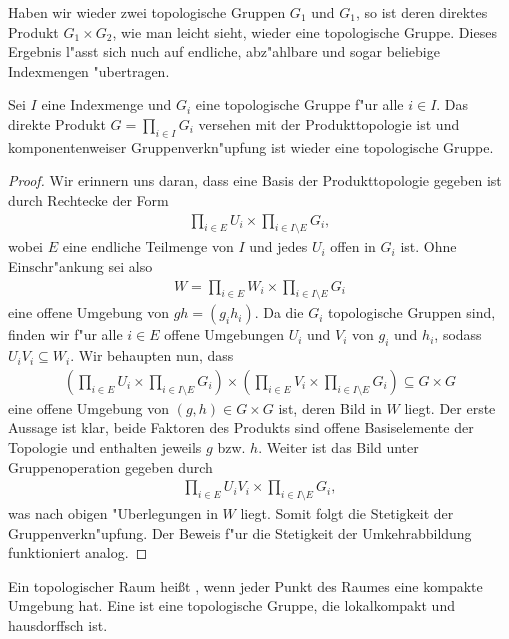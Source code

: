 	Haben wir wieder zwei topologische Gruppen $G_1$ und $G_1$, so ist deren direktes Produkt $G_1\times G_2$, wie man leicht sieht, wieder eine topologische Gruppe.
	Dieses Ergebnis l"asst sich nuch auf endliche, abz"ahlbare und sogar beliebige Indexmengen "ubertragen. 
	\begin{lemma}
	\label{lemma:direktesProduktTopologischerGruppen}
		Sei $I$ eine Indexmenge und $G_i$ eine topologische Gruppe f"ur alle $i \in I$. 
		Das direkte Produkt $G = \prod_{i \in I} G_i$ versehen mit der Produkttopologie ist und komponentenweiser Gruppenverkn"upfung ist wieder eine topologische Gruppe.
	\end{lemma}
	\begin{proof}
		Wir erinnern uns daran, dass eine Basis der Produkttopologie gegeben ist durch Rechtecke der Form
		\begin{align*}
			\prod_{i \in E} U_i \times \prod_{i \in I\setminus E}  G_i,
		\end{align*}
		wobei $E$ eine endliche Teilmenge von $I$ und jedes $U_i$ offen in $G_i$ ist. 
		Ohne Einschr"ankung sei also 
		\begin{align*}
			W = \prod_{i \in E} W_i \times \prod_{i \in I\setminus E}  G_i
		\end{align*}
		eine offene Umgebung von $gh = (g_i h_i)$. 
		Da die $G_i$ topologische Gruppen sind, finden wir f"ur  alle $i\in E$ offene Umgebungen $U_i$ und $V_i$ von $g_i$ und $h_i$,  sodass  $U_i V_i \subseteq W_i$. Wir behaupten nun, dass
		\begin{align*}
			(\prod_{i \in E} U_i \times \prod_{i \in I\setminus E}  G_i) \times (\prod_{i \in E} V_i \times \prod_{i \in I\setminus E}  G_i) \subseteq G \times G
		\end{align*}
		eine offene Umgebung von $(g, h) \in G \times G$ ist, deren Bild in $W$ liegt. 
		Der erste Aussage ist klar, beide Faktoren des Produkts sind offene Basiselemente der Topologie und enthalten jeweils $g$ bzw. $h$.
		Weiter ist das Bild unter Gruppenoperation gegeben durch
		\begin{align*}
			\prod_{i \in E} U_i V_i \times \prod_{i \in I\setminus E}  G_i,
		\end{align*}
		was nach obigen "Uberlegungen in $W$ liegt.
		Somit folgt die Stetigkeit der Gruppenverkn"upfung.
		Der Beweis f"ur die Stetigkeit der Umkehrabbildung funktioniert analog.
	\end{proof}
	
	\begin{defi}
		Ein topologischer Raum heißt , wenn jeder Punkt des Raumes eine kompakte Umgebung hat. 
		Eine  ist eine topologische Gruppe, die lokalkompakt und hausdorffsch ist. 
	\end{defi}
	
